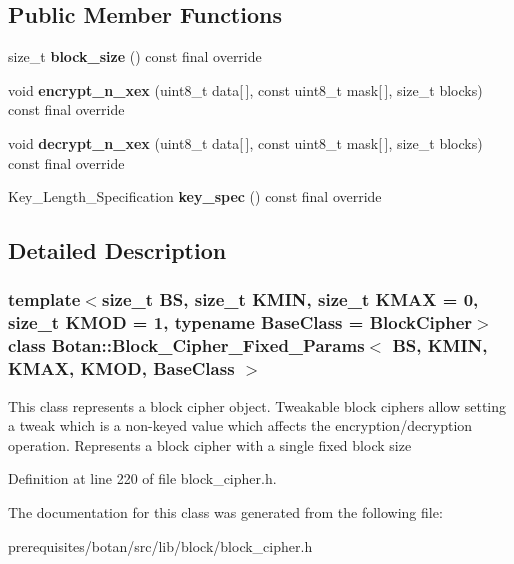 \subsection*{Public Member Functions}
\begin{DoxyCompactItemize}
\item 
\mbox{\label{class_botan_1_1_block___cipher___fixed___params_aa9c361c59f811145a1606c46cf379676}} 
size\+\_\+t {\bfseries block\+\_\+size} () const final override
\item 
\mbox{\label{class_botan_1_1_block___cipher___fixed___params_a5d9a4c02ac74524e9d5de015d245b65c}} 
void {\bfseries encrypt\+\_\+n\+\_\+xex} (uint8\+\_\+t data\mbox{[}$\,$\mbox{]}, const uint8\+\_\+t mask\mbox{[}$\,$\mbox{]}, size\+\_\+t blocks) const final override
\item 
\mbox{\label{class_botan_1_1_block___cipher___fixed___params_afc72841501e733feef50c6bcedb4d0a6}} 
void {\bfseries decrypt\+\_\+n\+\_\+xex} (uint8\+\_\+t data\mbox{[}$\,$\mbox{]}, const uint8\+\_\+t mask\mbox{[}$\,$\mbox{]}, size\+\_\+t blocks) const final override
\item 
\mbox{\label{class_botan_1_1_block___cipher___fixed___params_a38b9617389d66c27198fb6c247da453a}} 
Key\+\_\+\+Length\+\_\+\+Specification {\bfseries key\+\_\+spec} () const final override
\end{DoxyCompactItemize}


\subsection{Detailed Description}
\subsubsection*{template$<$size\+\_\+t BS, size\+\_\+t K\+M\+IN, size\+\_\+t K\+M\+AX = 0, size\+\_\+t K\+M\+OD = 1, typename Base\+Class = Block\+Cipher$>$\newline
class Botan\+::\+Block\+\_\+\+Cipher\+\_\+\+Fixed\+\_\+\+Params$<$ B\+S, K\+M\+I\+N, K\+M\+A\+X, K\+M\+O\+D, Base\+Class $>$}

This class represents a block cipher object. Tweakable block ciphers allow setting a tweak which is a non-\/keyed value which affects the encryption/decryption operation. Represents a block cipher with a single fixed block size 

Definition at line 220 of file block\+\_\+cipher.\+h.



The documentation for this class was generated from the following file\+:\begin{DoxyCompactItemize}
\item 
prerequisites/botan/src/lib/block/block\+\_\+cipher.\+h\end{DoxyCompactItemize}
